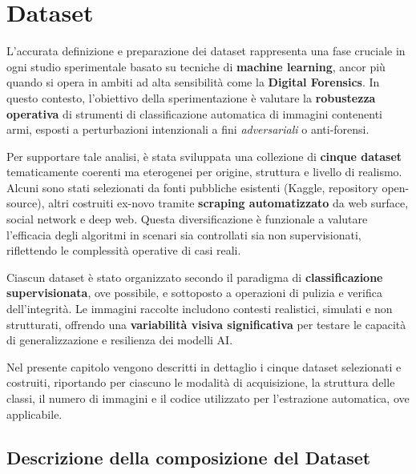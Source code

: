 \section{Dataset}
\label{chap:dataset}

L’accurata definizione e preparazione dei dataset rappresenta una fase cruciale in ogni studio sperimentale basato su tecniche di \textbf{machine learning}, ancor più quando si opera in ambiti ad alta sensibilità come la \textbf{Digital Forensics}. In questo contesto, l’obiettivo della sperimentazione è valutare la \textbf{robustezza operativa} di strumenti di classificazione automatica di immagini contenenti armi, esposti a perturbazioni intenzionali a fini \textit{adversariali} o anti-forensi.

Per supportare tale analisi, è stata sviluppata una collezione di \textbf{cinque dataset} tematicamente coerenti ma eterogenei per origine, struttura e livello di realismo. Alcuni sono stati selezionati da fonti pubbliche esistenti (Kaggle, repository open-source), altri costruiti ex-novo tramite \textbf{scraping automatizzato} da web surface, social network e deep web. Questa diversificazione è funzionale a valutare l’efficacia degli algoritmi in scenari sia controllati sia non supervisionati, riflettendo le complessità operative di casi reali.

Ciascun dataset è stato organizzato secondo il paradigma di \textbf{classificazione supervisionata}, ove possibile, e sottoposto a operazioni di pulizia e verifica dell’integrità. Le immagini raccolte includono contesti realistici, simulati e non strutturati, offrendo una \textbf{variabilità visiva significativa} per testare le capacità di generalizzazione e resilienza dei modelli AI.

Nel presente capitolo vengono descritti in dettaglio i cinque dataset selezionati e costruiti, riportando per ciascuno le modalità di acquisizione, la struttura delle classi, il numero di immagini e il codice utilizzato per l’estrazione automatica, ove applicabile.











\subsection*{Descrizione della composizione del Dataset}
\label{sec:descrizione-dataset}

